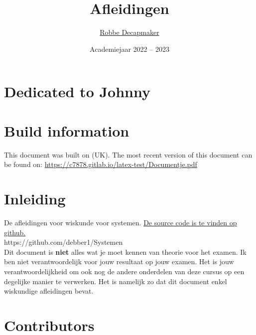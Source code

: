 \documentclass[a4paper,kul]{kulakarticle} %
\date{Academiejaar 2022 -- 2023}
\title{Afleidingen}
\author{\href{https://github.com/debber1}{Robbe Decapmaker}}
\begin{document}
\maketitle
\section*{Dedicated to Johnny}
\section*{Build information}
This document was built on \DTMNow (UK).
\newline
The most recent version of this document can be found on: \href{https://c7878.gitlab.io/latex-test/Documentje.pdf}{https://c7878.gitlab.io/latex-test/Documentje.pdf}
\section*{Inleiding}

De afleidingen voor wiskunde voor systemen. \href{https://github.com/debber1/Systemen}{De source code is te vinden op github.}\\
https://github.com/debber1/Systemen\\
\newline
Dit document is \textbf{niet} alles wat je moet kennen van theorie voor het examen. Ik ben niet verantwoordelijk voor jouw resultaat op jouw examen. Het is jouw verantwoordelijkheid om ook nog de andere onderdelen van deze cursus op een degelijke manier te verwerken. Het is namelijk zo dat dit document enkel wiskundige afleidingen bevat.\\

\section*{Contributors}

\newpage

\end{document}
